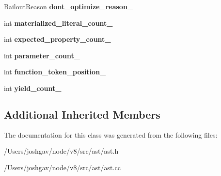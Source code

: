 \begin{DoxyCompactItemize}
\item 
Bailout\+Reason {\bfseries dont\+\_\+optimize\+\_\+reason\+\_\+}\hypertarget{classv8_1_1internal_1_1_function_literal_a2a2c5989d5e2e251fd0de7b222f55840}{}\label{classv8_1_1internal_1_1_function_literal_a2a2c5989d5e2e251fd0de7b222f55840}

\item 
int {\bfseries materialized\+\_\+literal\+\_\+count\+\_\+}\hypertarget{classv8_1_1internal_1_1_function_literal_a59584aaf770706c32975164d4aaba24a}{}\label{classv8_1_1internal_1_1_function_literal_a59584aaf770706c32975164d4aaba24a}

\item 
int {\bfseries expected\+\_\+property\+\_\+count\+\_\+}\hypertarget{classv8_1_1internal_1_1_function_literal_a9eb4189a4410b38d2f0244423258d6cd}{}\label{classv8_1_1internal_1_1_function_literal_a9eb4189a4410b38d2f0244423258d6cd}

\item 
int {\bfseries parameter\+\_\+count\+\_\+}\hypertarget{classv8_1_1internal_1_1_function_literal_aec66a049a2bac02d546f09e7ff68bfc0}{}\label{classv8_1_1internal_1_1_function_literal_aec66a049a2bac02d546f09e7ff68bfc0}

\item 
int {\bfseries function\+\_\+token\+\_\+position\+\_\+}\hypertarget{classv8_1_1internal_1_1_function_literal_aefc3eed6024e3f017f34305073da8c55}{}\label{classv8_1_1internal_1_1_function_literal_aefc3eed6024e3f017f34305073da8c55}

\item 
int {\bfseries yield\+\_\+count\+\_\+}\hypertarget{classv8_1_1internal_1_1_function_literal_ae180123585434d2835fe73f95c90e36e}{}\label{classv8_1_1internal_1_1_function_literal_ae180123585434d2835fe73f95c90e36e}

\end{DoxyCompactItemize}
\subsection*{Additional Inherited Members}


The documentation for this class was generated from the following files\+:\begin{DoxyCompactItemize}
\item 
/\+Users/joshgav/node/v8/src/ast/ast.\+h\item 
/\+Users/joshgav/node/v8/src/ast/ast.\+cc\end{DoxyCompactItemize}
